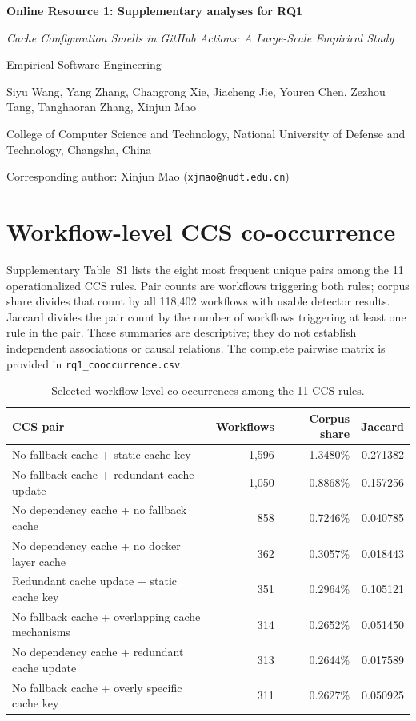 \documentclass[a4paper]{article}
\begin{document}
\begin{center}
{\Large\textbf{Online Resource 1: Supplementary analyses for RQ1}\par}
\vspace{4mm}
{\small\textit{Cache Configuration Smells in GitHub Actions: A Large-Scale Empirical Study}\par}
{\small Empirical Software Engineering\par}
{\small Siyu Wang, Yang Zhang, Changrong Xie, Jiacheng Jie, Youren Chen, Zezhou Tang, Tanghaoran Zhang, Xinjun Mao\par}
{\small College of Computer Science and Technology, National University of Defense and Technology, Changsha, China\par}
{\small Corresponding author: Xinjun Mao (\texttt{xjmao@nudt.edu.cn})\par}
\end{center}

\section*{Workflow-level CCS co-occurrence}

Supplementary Table~S1 lists the eight most frequent unique pairs among the
11 operationalized CCS rules. Pair counts are workflows triggering both
rules; corpus share divides that count by all 118,402 workflows with usable detector results.
Jaccard divides the pair count by the number of workflows triggering at least
one rule in the pair. These summaries are descriptive; they do not establish
independent associations or causal relations. The complete pairwise matrix is
provided in \texttt{rq1\_cooccurrence.csv}.

\begin{table}[H]
\centering
\small
\caption{Selected workflow-level co-occurrences among the 11 CCS rules.}
\label{tab:supp-smell-cooccurrence}
\begin{tabular}{p{}rrr}
\hline
CCS pair & Workflows & Corpus share & Jaccard\\
\hline
No fallback cache + static cache key & 1,596 & 1.3480\% & 0.271382\\
No fallback cache + redundant cache update & 1,050 & 0.8868\% & 0.157256\\
No dependency cache + no fallback cache & 858 & 0.7246\% & 0.040785\\
No dependency cache + no docker layer cache & 362 & 0.3057\% & 0.018443\\
Redundant cache update + static cache key & 351 & 0.2964\% & 0.105121\\
No fallback cache + overlapping cache mechanisms & 314 & 0.2652\% & 0.051450\\
No dependency cache + redundant cache update & 313 & 0.2644\% & 0.017589\\
No fallback cache + overly specific cache key & 311 & 0.2627\% & 0.050925\\
\hline
\end{tabular}
\end{table}
\end{document}
